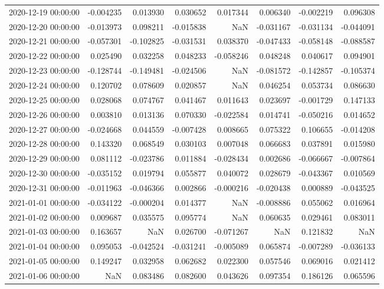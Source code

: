 \begin{tabular}{lrrrrrrr}
2020-12-19 00:00:00 & -0.004235 & 0.013930 & 0.030652 & 0.017344 & 0.006340 & -0.002219 & 0.096308 \\
2020-12-20 00:00:00 & -0.013973 & 0.098211 & -0.015838 & NaN & -0.031167 & -0.031134 & -0.044091 \\
2020-12-21 00:00:00 & -0.057301 & -0.102825 & -0.031531 & 0.038370 & -0.047433 & -0.058148 & -0.088587 \\
2020-12-22 00:00:00 & 0.025490 & 0.032258 & 0.048233 & -0.058246 & 0.048248 & 0.040617 & 0.094901 \\
2020-12-23 00:00:00 & -0.128744 & -0.149481 & -0.024506 & NaN & -0.081572 & -0.142857 & -0.105374 \\
2020-12-24 00:00:00 & 0.120702 & 0.078609 & 0.020857 & NaN & 0.046254 & 0.053734 & 0.086630 \\
2020-12-25 00:00:00 & 0.028068 & 0.074767 & 0.041467 & 0.011643 & 0.023697 & -0.001729 & 0.147133 \\
2020-12-26 00:00:00 & 0.003810 & 0.013136 & 0.070330 & -0.022584 & 0.014741 & -0.050216 & 0.014652 \\
2020-12-27 00:00:00 & -0.024668 & 0.044559 & -0.007428 & 0.008665 & 0.075322 & 0.106655 & -0.014208 \\
2020-12-28 00:00:00 & 0.143320 & 0.068549 & 0.030103 & 0.007048 & 0.066683 & 0.037891 & 0.015980 \\
2020-12-29 00:00:00 & 0.081112 & -0.023786 & 0.011884 & -0.028434 & 0.002686 & -0.066667 & -0.007864 \\
2020-12-30 00:00:00 & -0.035152 & 0.019794 & 0.055877 & 0.040072 & 0.028679 & -0.043367 & 0.010569 \\
2020-12-31 00:00:00 & -0.011963 & -0.046366 & 0.002866 & -0.000216 & -0.020438 & 0.000889 & -0.043525 \\
2021-01-01 00:00:00 & -0.034122 & -0.000204 & 0.014377 & NaN & -0.008886 & 0.055062 & 0.016964 \\
2021-01-02 00:00:00 & 0.009687 & 0.035575 & 0.095774 & NaN & 0.060635 & 0.029461 & 0.083011 \\
2021-01-03 00:00:00 & 0.163657 & NaN & 0.026700 & -0.071267 & NaN & 0.121832 & NaN \\
2021-01-04 00:00:00 & 0.095053 & -0.042524 & -0.031241 & -0.005089 & 0.065874 & -0.007289 & -0.036133 \\
2021-01-05 00:00:00 & 0.149247 & 0.032958 & 0.062682 & 0.022300 & 0.057546 & 0.069016 & 0.021412 \\
2021-01-06 00:00:00 & NaN & 0.083486 & 0.082600 & 0.043626 & 0.097354 & 0.186126 & 0.065596 \\

\end{tabular}
